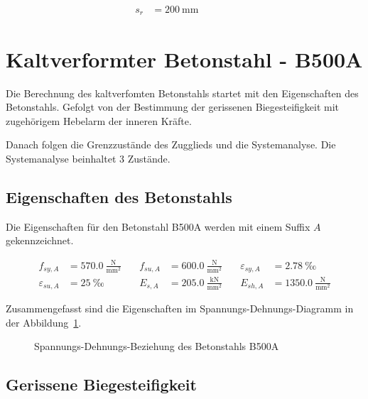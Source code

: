 \documentclass[
  11pt,
  letterpaper,
]{scrreprt}
\makeatletter
\newcommand*\pandocbounded[1]{%
  \sbox\pandoc@box{#1}%
  \Gscale@div\@tempa{\textheight}{\dimexpr\ht\pandoc@box+\dp\pandoc@box\relax}%
  \Gscale@div\@tempb{\linewidth}{\wd\pandoc@box}%
  \ifdim\@tempb\p@<\@tempa\p@\let\@tempa\@tempb\fi%
  \ifdim\@tempa\p@<\p@\scalebox{\@tempa}{\usebox\pandoc@box}%
  \else\usebox{\pandoc@box}%
  \fi%
}
\makeatother
\begin{document}
\[
\begin{aligned}
s_{r}& = 200 \ \mathrm{mm} \quad &  \quad &  
 \end{aligned}
\]

\section{Kaltverformter Betonstahl -
B500A}\label{kaltverformter-betonstahl---b500a}

Die Berechnung des kaltverfomten Betonstahls startet mit den
Eigenschaften des Betonstahls. Gefolgt von der Bestimmung der gerissenen
Biegesteifigkeit mit zugehörigem Hebelarm der inneren Kräfte.

Danach folgen die Grenzzustände des Zugglieds und die Systemanalyse. Die
Systemanalyse beinhaltet 3 Zustände.

\subsection{Eigenschaften des
Betonstahls}\label{eigenschaften-des-betonstahls}

Die Eigenschaften für den Betonstahl B500A werden mit einem Suffix \(A\)
gekennzeichnet.

\[
\begin{aligned}
f_{sy , A}& = 570.0 \ \frac{\mathrm{N}}{\mathrm{mm}^{2}} \quad & f_{su , A}& = 600.0 \ \frac{\mathrm{N}}{\mathrm{mm}^{2}} \quad & \varepsilon_{sy , A}& = 2.78 \ \mathrm{‰} \\ 
\varepsilon_{su , A}& = 25 \ \mathrm{‰} \quad & E_{s , A}& = 205.0 \ \frac{\mathrm{kN}}{\mathrm{mm}^{2}} \quad & E_{sh , A}& = 1350.0 \ \frac{\mathrm{N}}{\mathrm{mm}^{2}} \end{aligned}
\]

Zusammengefasst sind die Eigenschaften im Spannungs-Dehnungs-Diagramm in
der Abbildung~\ref{fig-stress_strain_b500a}.

\begin{figure}[H]

\centering{

\pandocbounded{}

}

\caption{\label{fig-stress_strain_b500a}Spannungs-Dehnungs-Beziehung des
Betonstahls B500A}

\end{figure}%

\subsection{Gerissene
Biegesteifigkeit}\label{gerissene-biegesteifigkeit}
\end{document}
